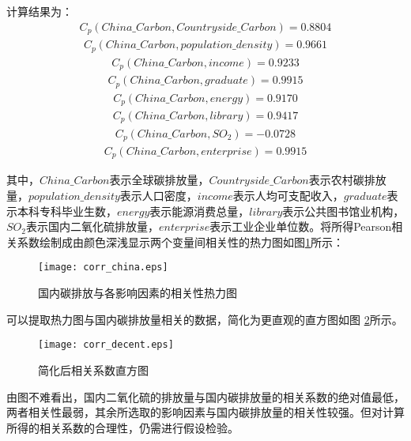 \documentclass[withoutpreface,bwprint]{cumcmthesis}
\begin{document}
计算结果为：
\begin{align*}
	{C_p}(China\_Carbon,Countryside\_Carbon)=0.8804
\end{align*}
\begin{align*}
	{C_p}(China\_Carbon,population\_density)=0.9661
\end{align*}
\begin{align*}
	{C_p}(China\_Carbon,income)=0.9233
\end{align*}
\begin{align*}
	{C_p}(China\_Carbon,graduate)=0.9915
\end{align*}
\begin{align*}
	{C_p}(China\_Carbon,energy)=0.9170
\end{align*}
\begin{align*}
	{C_p}(China\_Carbon,library)=0.9417
\end{align*}
\begin{align*}
	{C_p}(China\_Carbon,SO_2)=-0.0728
\end{align*}
\begin{align*}
	{C_p}(China\_Carbon,enterprise)=0.9915
\end{align*}


	其中，$China\_Carbon$表示全球碳排放量，$Countryside\_Carbon$表示农村碳排放量，$population\_density$表示人口密度，$income$表示人均可支配收入，$graduate$表示本科专科毕业生数，$energy$表示能源消费总量，$library$表示公共图书馆业机构，$SO_2$表示国内二氧化硫排放量，$enterprise$表示工业企业单位数。将所得Pearson相关系数绘制成由颜色深浅显示两个变量间相关性的热力图如图\ref{fig:corrchina}所示：
	
\begin{figure}[htbp]
	\centering
	\texttt{[image: corr\_china.eps]}
	\caption{国内碳排放与各影响因素的相关性热力图}
	\label{fig:corrchina}
\end{figure}
	

可以提取热力图与国内碳排放量相关的数据，简化为更直观的直方图如图 \ref{fig:corrdecent}所示。
	
\begin{figure}[H]
	\centering
	\texttt{[image: corr\_decent.eps]}
	\caption{简化后相关系数直方图}
	\label{fig:corrdecent}
\end{figure}

	由图不难看出，国内二氧化硫的排放量与国内碳排放量的相关系数的绝对值最低，两者相关性最弱，其余所选取的影响因素与国内碳排放量的相关性较强。但对计算所得的相关系数的合理性，仍需进行假设检验。
	
\end{document}
